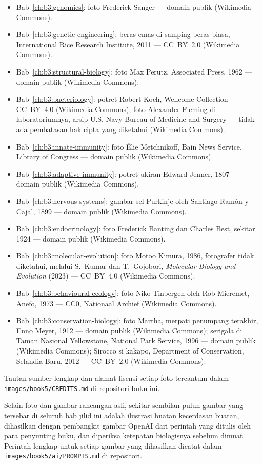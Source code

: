 \begin{itemize}
  \item Bab~\ref{ch:b3:genomics}: foto Frederick Sanger --- domain
        publik (Wikimedia Commons).
  \item Bab~\ref{ch:b3:genetic-engineering}: beras emas di samping
        beras biasa, International Rice Research Institute, 2011 ---
        CC~BY~2.0 (Wikimedia Commons).
  \item Bab~\ref{ch:b3:structural-biology}: foto Max Perutz, Associated
        Press, 1962 --- domain publik (Wikimedia Commons).
  \item Bab~\ref{ch:b3:bacteriology}: potret Robert Koch, Wellcome
        Collection --- CC~BY~4.0 (Wikimedia Commons); foto Alexander
        Fleming di laboratoriumnya, arsip U.S. Navy Bureau of Medicine
        and Surgery --- tidak ada pembatasan hak cipta yang diketahui
        (Wikimedia Commons).
  \item Bab~\ref{ch:b3:innate-immunity}: foto Élie Metchnikoff, Bain
        News Service, Library of Congress --- domain publik (Wikimedia
        Commons).
  \item Bab~\ref{ch:b3:adaptive-immunity}: potret ukiran Edward Jenner,
        1807 --- domain publik (Wikimedia Commons).
  \item Bab~\ref{ch:b3:nervous-systems}: gambar sel Purkinje oleh
        Santiago Ramón y Cajal, 1899 --- domain publik (Wikimedia
        Commons).
  \item Bab~\ref{ch:b3:endocrinology}: foto Frederick Banting dan
        Charles Best, sekitar 1924 --- domain publik (Wikimedia
        Commons).
  \item Bab~\ref{ch:b3:molecular-evolution}: foto Motoo Kimura, 1986,
        fotografer tidak diketahui, melalui S.~Kumar dan T.~Gojobori,
        \emph{Molecular Biology and Evolution} (2023) --- CC~BY~4.0
        (Wikimedia Commons).
  \item Bab~\ref{ch:b3:behavioural-ecology}: foto Niko Tinbergen oleh
        Rob Mieremet, Anefo, 1973 --- CC0, Nationaal Archief (Wikimedia
        Commons).
  \item Bab~\ref{ch:b3:conservation-biology}: foto Martha, merpati
        penumpang terakhir, Enno Meyer, 1912 --- domain publik
        (Wikimedia Commons); serigala di Taman Nasional Yellowstone,
        National Park Service, 1996 --- domain publik (Wikimedia
        Commons); Sirocco si kakapo, Department of Conservation,
        Selandia Baru, 2012 --- CC~BY~2.0 (Wikimedia Commons).
\end{itemize}

Tautan sumber lengkap dan alamat lisensi setiap foto tercantum dalam
\texttt{images/\allowbreak book5/\allowbreak CREDITS.md} di repositori buku ini.

\bigskip
Selain foto dan gambar rancangan asli, sekitar sembilan puluh gambar
yang tersebar di seluruh bab jilid ini adalah ilustrasi buatan
kecerdasan buatan, dihasilkan dengan pembangkit gambar OpenAI dari
perintah yang ditulis oleh para penyunting buku, dan diperiksa
ketepatan biologisnya sebelum dimuat. Perintah lengkap untuk setiap
gambar yang dihasilkan dicatat dalam
\texttt{images/\allowbreak book5/\allowbreak ai/\allowbreak PROMPTS.md} di repositori.
\par\endgroup
\clearpage

